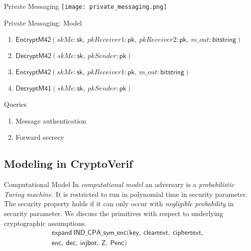 \documentclass{beamer}
\begin{document}

\begin{frame}{Private Messaging}
  \texttt{[image: private\_messaging.png]}
\end{frame}

\begin{frame}{Private Messaging: Model}
  \begin{enumerate}
  	\item $\mathsf{EncryptM42}(skMe:\mathsf{sk},\ pkReceiver1:\mathsf{pk},\ pkReceiver2:\mathsf{pk},\ m\_out: \mathsf{bitstring})$
  	\item $\mathsf{DecryptM42}(skMe:\mathsf{sk},\ pkSender:\mathsf{pk})$
  	\item $\mathsf{EncryptM42}(skMe:\mathsf{sk},\ pkReceiver1:\mathsf{pk},\ m\_out: \mathsf{bitstring})$
  	\item $\mathsf{DecryptM41}(skMe:\mathsf{sk},\ pkSender:\mathsf{pk})$
  \end{enumerate}
\end{frame}

\begin{frame}{Queries}
  \begin{enumerate}
    \item Message authentication
      {\tabto{6cm}\textcolor{green!80!black}{{\large\Checkedbox}}}
    \item Forward secrecy
      {\tabto{6cm}\textcolor{green!80!black}{{\large\Checkedbox}}}
  \end{enumerate}
\end{frame}


\subsection{Modeling in CryptoVerif}


\begin{frame}{Computational Model}
    In \textit{computational model} an adversary is a \textit{probabilistic Turing machine}. It is restricted to run in
polynomial time in security parameter. The security property holds if it can only occur with \textit{negligible probability} in security parameter.
    We discuss the primitives with respect to underlying cryptographic assumptions.
    \begin{equation*}\begin{array}{l}
        \mathsf{expand}\ \mathsf{IND\_CPA\_sym\_enc}(\mathsf{key},\ \mathsf{cleartext},\ \mathsf{ciphertext},\\
        \mathsf{enc},\ \mathsf{dec},\ \mathsf{injbot},\ \mathsf{Z},\ \mathsf{Penc})
    \end{array}\end{equation*}
\end{frame}
\end{document}
